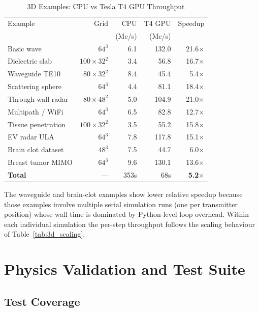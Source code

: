\documentclass[10pt,twocolumn]{article}
\begin{document}
\begin{table}[h]
\centering
\caption{3D Examples: CPU vs Tesla T4 GPU Throughput}
\label{tab:3d_examples}
\begin{tabular}{lrrrr}
\toprule
Example & Grid & CPU & T4 GPU & Speedup \\
        &      & (Mc/s) & (Mc/s) & \\
\midrule
Basic wave         & $64^3$        &  6.1 & 132.0 & 21.6$\times$ \\
Dielectric slab    & $100\!\times\!32^2$ & 3.4 & 56.8 & 16.7$\times$ \\
Waveguide TE10     & $80\!\times\!32^2$ & 8.4 & 45.4 & 5.4$\times$ \\
Scattering sphere  & $64^3$        &  4.4 &  81.1 & 18.4$\times$ \\
Through-wall radar & $80\!\times\!48^2$ & 5.0 & 104.9 & 21.0$\times$ \\
Multipath / WiFi   & $64^3$        &  6.5 &  82.8 & 12.7$\times$ \\
Tissue penetration & $100\!\times\!32^2$ & 3.5 & 55.2 & 15.8$\times$ \\
EV radar ULA       & $64^3$        &  7.8 & 117.8 & 15.1$\times$ \\
Brain clot dataset & $48^3$        &  7.5 &  44.7 &  6.0$\times$ \\
Breast tumor MIMO  & $64^3$        &  9.6 & 130.1 & 13.6$\times$ \\
\midrule
\textbf{Total}     & ---           & 353s &  68s  & \textbf{5.2$\times$} \\
\bottomrule
\end{tabular}
\end{table}

The waveguide and brain-clot examples show lower relative speedup because
those examples involve multiple serial simulation runs (one per transmitter
position) whose wall time is dominated by Python-level loop overhead. Within
each individual simulation the per-step throughput follows the scaling
behaviour of Table~\ref{tab:3d_scaling}.

\section{Physics Validation and Test Suite}
\label{sec:validation}

\subsection{Test Coverage}
\end{document}
